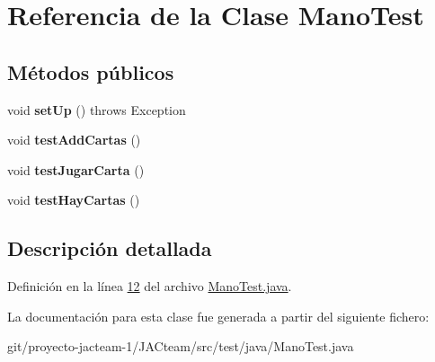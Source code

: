 \hypertarget{class_mano_test}{}\section{Referencia de la Clase Mano\+Test}
\label{class_mano_test}
\subsection*{Métodos públicos}
\begin{DoxyCompactItemize}
\item 
\mbox{\label{class_mano_test_aeaaaa777b4b04322ec21f9c23b79251b}} 
void {\bfseries set\+Up} ()  throws Exception 
\item 
\mbox{\label{class_mano_test_a9aa7225dfb5bf87d175e1b2bf7db7e19}} 
void {\bfseries test\+Add\+Cartas} ()
\item 
\mbox{\label{class_mano_test_aea6b2b5149301915c405c0124f287b95}} 
void {\bfseries test\+Jugar\+Carta} ()
\item 
\mbox{\label{class_mano_test_a2f3d52113a10ea425b2b27cfc0bb4747}} 
void {\bfseries test\+Hay\+Cartas} ()
\end{DoxyCompactItemize}


\subsection{Descripción detallada}


Definición en la línea \mbox{\hyperlink{_mano_test_8java_source_l00012}{12}} del archivo \mbox{\hyperlink{_mano_test_8java_source}{Mano\+Test.\+java}}.



La documentación para esta clase fue generada a partir del siguiente fichero\+:\begin{DoxyCompactItemize}
\item 
git/proyecto-\/jacteam-\/1/\+J\+A\+Cteam/src/test/java/Mano\+Test.\+java\end{DoxyCompactItemize}
